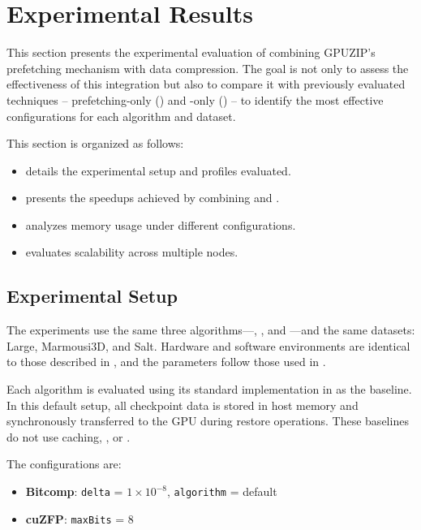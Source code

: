 \documentclass[Ingles]{ic-tese-v3}
\begin{document}
\section{Experimental Results}
\label{sec:comppref_results}

This section presents the experimental evaluation of combining GPUZIP’s prefetching mechanism with data compression. The goal is not only to assess the effectiveness of this integration but also to compare it with previously evaluated techniques -- prefetching-only () and \compression-only () -- to identify the most effective configurations for each \checkpointing algorithm and dataset.

This section is organized as follows:
\begin{itemize}
    \item {} details the experimental setup and profiles evaluated.
    \item {} presents the speedups achieved by combining \prefetching and \compression.
    \item {} analyzes memory usage under different configurations.
    \item {} evaluates scalability across multiple nodes.
\end{itemize}

\subsection{Experimental Setup}
\label{sec:comppref_experimental_setup}

The experiments use the same three \checkpointing algorithms—\revolve, \zcut, and \uniform—and the same datasets: Large, Marmousi3D, and Salt. Hardware and software environments are identical to those described in , and the \compression parameters follow those used in .

Each \checkpointing algorithm is evaluated using its standard implementation in \awave as the baseline. In this default setup, all checkpoint data is stored in host memory and synchronously transferred to the GPU during restore operations. These baselines do not use caching, \compression, or \prefetching.

The \compression configurations are:

\begin{itemize}
    \item \textbf{Bitcomp}: \texttt{delta} = $1 \times 10^{-8}$, \texttt{algorithm} = default
    \item \textbf{cuZFP}: \texttt{maxBits} = 8
\end{itemize}
\end{document}
